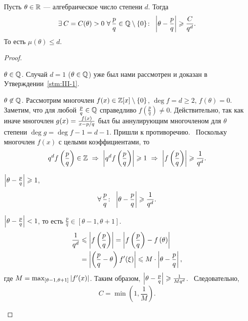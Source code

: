 \begin{ntheorem}[Лиувилля]
\label{thm:III_Liouville}
    Пусть $\theta \in \mathbb{R}$ --- алгебраическое число степени $d$. Тогда
    \[
        \exists C = C(\theta) > 0\ \forall \frac{p}{q} \in \QQ \setminus \{ 0 \}\colon \ \abs{\theta - \frac{p}{q}} \ge \frac{C}{q^d}.
    \]
    То есть $\mu(\theta) \le d$.
\end{ntheorem}
\begin{proof}
    \hfill
    \begin{casesp}
        \item
        $\theta \in \mathbb{Q}$. 
            Случай $d = 1$ ($\theta \in \mathbb{Q}$) уже был нами рассмотрен и доказан в Утверждении~\ref{stm:III-1}.
        \item
        $\theta \not\in \mathbb{Q}$. 
            Рассмотрим многочлен $f(x) \in \mathbb{Z}[x] \setminus \{ 0 \}$, $\deg{f} = d \ge 2$, $f(\theta) = 0$. Заметим, что для любой $\frac{p}{q} \in \mathbb{Q}$ справедливо $f\left(\frac{p}{q}\right) \ne 0$. Действительно, так как иначе многочлен $g(x) = \frac{f(x)}{x - p / q}$ был бы аннулирующим многочленом для $\theta$ степени $\deg{g} = \deg{f} - 1 = d - 1$. Пришли к противоречию.~\newline
            Поскольку многочлен $f(x)$ с целыми коэффициентами, то 
            \[
                q^d f\left(\frac{p}{q}\right) \in \ZZ \ \Rightarrow \ 
                \abs{q^d f\left(\frac{p}{q}\right)} \ge 1 \ \Rightarrow \ 
                \abs{f\left(\frac{p}{q}\right)} \ge \frac{1}{q^d}.
            \]
            \begin{casesp}
                \item
                $\left| \theta - \frac{p}{q} \right| \geqslant 1$,
                    \[
                        \forall \frac{p}{q}\colon \ \abs{\theta - \frac{p}{q}} \ge \frac{1}{q^d}.
                    \]
                \item
                $\left| \theta - \frac{p}{q} \right| < 1$, то есть $\frac{p}{q} \in [\theta - 1, \theta + 1]$. 
                    \begin{align*}
                        \frac{1}{q^d} &\leqslant \left| f\left(\frac{p}{q}\right) \right| = \left| f\left(\frac{p}{q}\right) - f\left(\theta\right) \right| \\
                        &= \left| \left(\frac{p}{q} - \theta\right)f'(\xi) \right| \leqslant M \cdot \left| \theta - \frac{p}{q} \right|,
                    \end{align*}
                    где $M = \max_{[\theta-1, \theta+1]} \left| f'(x) \right|$. Таким образом, $\left| \theta - \frac{p}{q} \right| \geqslant \frac{1}{Mq^d}$.~\newline
                    Следовательно, 
                    \[
                        C = \min\left( 1, \frac{1}{M} \right).
                    \]
            \end{casesp}
    \end{casesp}
\end{proof}    

